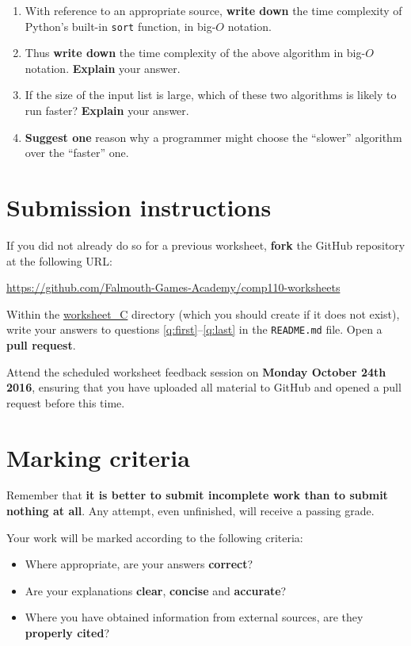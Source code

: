 \documentclass{../../fal_assignment}
\begin{document}
\begin{enumerate}[resume,label=(\alph*)]
	\item With reference to an appropriate source, \textbf{write down} the time complexity of Python's built-in
		\lstinline{sort} function, in big-$O$ notation.
	\item Thus \textbf{write down} the time complexity of the above algorithm in big-$O$ notation.
		\textbf{Explain} your answer.
	\item If the size of the input list is large, which of these two algorithms is likely to run faster?
		\textbf{Explain} your answer.
	\item \textbf{Suggest one} reason why a programmer might choose the ``slower'' algorithm
		over the ``faster'' one.
	\label{q:last}
\end{enumerate}

\section*{Submission instructions}

If you did not already do so for a previous worksheet, \textbf{fork} the GitHub repository at the following URL:

\url{https://github.com/Falmouth-Games-Academy/comp110-worksheets}

Within the \url{worksheet_C} directory (which you should create if it does not exist),
write your answers to questions \ref{q:first}--\ref{q:last} in the \texttt{README.md} file.
Open a \textbf{pull request}.

Attend the scheduled worksheet feedback session on \textbf{Monday October 24th 2016},
ensuring that you have uploaded all material to GitHub and opened a pull request before this time.

\section*{Marking criteria}

Remember that \textbf{it is better to submit incomplete work than to submit nothing at all}.
Any attempt, even unfinished, will receive a passing grade.

Your work will be marked according to the following criteria:
\begin{itemize}
	\item Where appropriate, are your answers \textbf{correct}?
	\item Are your explanations \textbf{clear}, \textbf{concise} and \textbf{accurate}?
	\item Where you have obtained information from external sources, are they \textbf{properly cited}?
\end{itemize}
\end{document}
